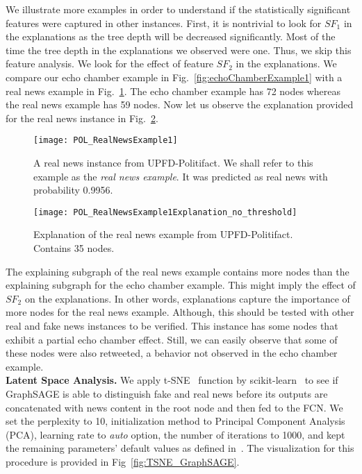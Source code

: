 We illustrate more examples in order to understand if the statistically significant features were captured in other instances. First, it is nontrivial to look for $SF_1$ in the explanations as the tree depth will be decreased significantly. Most of the time the tree depth in the explanations we observed were one. Thus, we skip this feature analysis. We look for the effect of feature $SF_2$ in the explanations. We compare our echo chamber example in Fig.~\ref{fig:echoChamberExample1} with a real news example in Fig.~\ref{fig:POL_RealNewsExample1}. The echo chamber example has 72 nodes whereas the real news example has 59 nodes. Now let us observe the explanation provided for the real news instance in Fig.~\ref{fig:POL_RealNewsExample1Explanation_no_threshold}.\\
\begin{figure}
    \centering
    \texttt{[image: POL\_RealNewsExample1]}
    \caption[A real news instance from UPFD-Politifact.]{A real news instance from UPFD-Politifact. We shall refer to this example as the \emph{real news example}. It was predicted as real news with probability 0.9956.}
    \label{fig:POL_RealNewsExample1}
\end{figure}
\begin{figure}
    \centering
    \texttt{[image: POL\_RealNewsExample1Explanation\_no\_threshold]}
    \caption[Explanation of the real news example from UPFD-Politifact]{Explanation of the real news example from UPFD-Politifact. Contains 35 nodes.}
    \label{fig:POL_RealNewsExample1Explanation_no_threshold}
\end{figure}
The explaining subgraph of the real news example contains more nodes than the explaining subgraph for the echo chamber example. This might imply the effect of $SF_2$ on the explanations. In other words, explanations capture the importance of more nodes for the real news example. Although, this should be tested with other real and fake news instances to be verified. This instance has some nodes that exhibit a partial echo chamber effect. Still, we can easily observe that some of these nodes were also retweeted, a behavior not observed in the echo chamber example.\\
\textbf{Latent Space Analysis.} We apply t-SNE~\parencite{tSNE_vanDerMaaten} function by scikit-learn~\parencite{ScikitLearn_Pedregosa} to see if GraphSAGE is able to distinguish fake and real news before its outputs are concatenated with news content in the root node and then fed to the FCN. We set the perplexity to 10, initialization method to Principal Component Analysis (PCA), learning rate to \emph{auto} option, the number of iterations to 1000, and kept the remaining parameters' default values as defined in~\cite{ScikitTSNE_scikit}. The visualization for this procedure is provided in Fig~\ref{fig:TSNE_GraphSAGE}.
